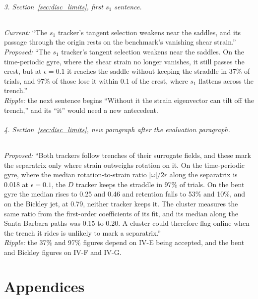 \documentclass[11pt]{article}
\begin{document}
\paragraph{3. Section~\ref{sec:disc_limits}, first $s_1$ sentence.}
\emph{Current:} ``The $s_1$ tracker's tangent selection weakens near the
saddles, and its passage through the origin rests on the benchmark's
vanishing shear strain.''\\
\emph{Proposed:} ``The $s_1$ tracker's tangent selection weakens near the
saddles. On the time-periodic gyre, where the shear strain no longer
vanishes, it still passes the crest, but at $\epsilon = 0.1$ it reaches the
saddle without keeping the straddle in 37\% of trials, and 97\% of those
lose it within 0.1 of the crest, where $s_1$ flattens across the
trench.''\\
\emph{Ripple:} the next sentence begins ``Without it the strain
eigenvector can tilt off the trench,'' and its ``it'' would need a new
antecedent.

\paragraph{4. Section~\ref{sec:disc_limits}, new paragraph after the
evaluation paragraph.}
\emph{Proposed:} ``Both trackers follow trenches of their surrogate
fields, and these mark the separatrix only where strain outweighs
rotation on it. On the time-periodic gyre, where the median
rotation-to-strain ratio $|\omega|/2r$ along the separatrix is 0.018 at
$\epsilon = 0.1$, the $D$ tracker keeps the straddle in 97\% of trials. On
the bent gyre the median rises to 0.25 and 0.46 and retention falls to
53\% and 10\%, and on the Bickley jet, at 0.79, neither tracker keeps it.
The cluster measures the same ratio from the first-order coefficients of
its fit, and its median along the Santa Barbara paths was 0.15 to 0.20. A
cluster could therefore flag online when the trench it rides is unlikely
to mark a separatrix.''\\
\emph{Ripple:} the 37\% and 97\% figures depend on IV-E being accepted,
and the bent and Bickley figures on IV-F and IV-G.

\appendix
\part*{Appendices}
\end{document}
